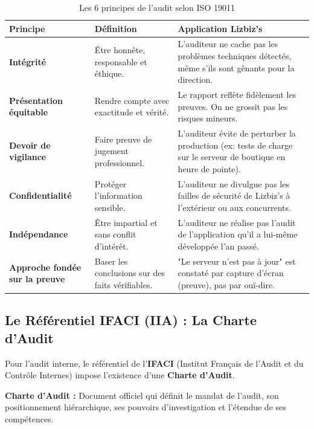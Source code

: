 \begin{table}[h!]
\centering
\small
\begin{tabular}{p{3cm}p{5cm}p{5cm}}
    \toprule
    \textbf{Principe} & \textbf{Définition} & \textbf{Application Lizbiz's} \\
    \midrule
    \textbf{Intégrité} & Être honnête, responsable et éthique. & L'auditeur ne cache pas les problèmes techniques détectés, même s'ils sont gênants pour la direction. \\
    \midrule
    \textbf{Présentation équitable} & Rendre compte avec exactitude et vérité. & Le rapport reflète fidèlement les preuves. On ne grossit pas les risques mineurs. \\
    \midrule
    \textbf{Devoir de vigilance} & Faire preuve de jugement professionnel. & L'auditeur évite de perturber la production (ex: tests de charge sur le serveur de boutique en heure de pointe). \\
    \midrule
    \textbf{Confidentialité} & Protéger l'information sensible. & L'auditeur ne divulgue pas les failles de sécurité de Lizbiz's à l'extérieur ou aux concurrents. \\
    \midrule
    \textbf{Indépendance} & Être impartial et sans conflit d'intérêt. & L'auditeur ne réalise pas l'audit de l'application qu'il a lui-même développée l'an passé. \\
    \midrule
    \textbf{Approche fondée sur la preuve} & Baser les conclusions sur des faits vérifiables. & "Le serveur n'est pas à jour" est constaté par capture d'écran (preuve), pas par ouï-dire. \\
    \bottomrule
\end{tabular}
\caption{Les 6 principes de l'audit selon ISO 19011}
\end{table}

\subsection{Le Référentiel IFACI (IIA) : La Charte d'Audit}

Pour l'audit interne, le référentiel de l'\textbf{IFACI} (Institut Français de l'Audit et du Contrôle Internes) impose l'existence d'une \textbf{Charte d'Audit}.

\begin{boxdef}
\textbf{Charte d'Audit :} Document officiel qui définit le mandat de l'audit, son positionnement hiérarchique, ses pouvoirs d'investigation et l'étendue de ses compétences.
\end{boxdef}

